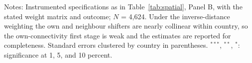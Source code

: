 \begin{table}[htbp]
\begin{threeparttable}
\begin{tabular}{lcccccc}
\bottomrule
\end{tabular}
\begin{tablenotes}[flushleft]
\scriptsize
\item Notes: Instrumented specifications as in Table~\ref{tab:spatial}, Panel B, with the stated weight matrix and outcome; $N$ = 4,624. Under the inverse-distance weighting the own and neighbour shifters are nearly collinear within country, so the own-connectivity first stage is weak and the estimates are reported for completeness. Standard errors clustered by country in parentheses. $^{***}$, $^{**}$, $^{*}$: significance at 1, 5, and 10 percent.
\end{tablenotes}
\end{threeparttable}
\end{table}

